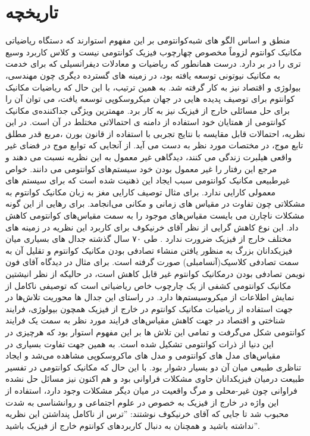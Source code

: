 \documentclass[a4paper,titlepage,12pt,fleqn,oneside]{report}
\begin{document}
  \section{تاریخچه}
 
  منطق و اساس الگو های شبه‌کوانتومی بر این مفهوم استوارند که دستگاه ریاضیاتی مکانیک کوانتوم لزوماً مخصوص چهارچوب فیزیک کوانتومی نیست و کلاس کاربرد وسیع تری را در بر دارد.  درست همانطور که ریاضیات و معادلات دیفرانسیلی که برای خدمت به مکانیک نیوتونی توسعه یافته بود،  در زمینه های گسترده دیگری چون مهندسی،  بیولوژی و اقتصاد  نیز به کار گرفته شد.  به همین ترتیب، با این حال که ریاضیات مکانیک کوانتوم برای توصیف پدیده هایی در جهان میکروسکوپی  توسعه یافت،  می توان آن را برای حل مسائلی خارج از فیزیک نیز به کار برد.  مهمترین ویژگی جداکننده‌ی مکانیک کوانتومی از همتایان خود استفاده از دامنه ی احتمالاتی مختلط در آن است. در این نظریه، احتمالات قابل مقایسه با نتایج تجربی با استفاده از قانون بورن ،مربع قدر مطلق تابع موج، در مختصات مورد نظر به دست می آید.  از آنجایی که توابع موج در فضای غیر واقعی 
  هیلبرت   زندگی می کنند،  دیدگاهی غیر معمول به این نظریه نسبت می دهند و مرجع  این رفتار را غیر معمول بودن خود  سیستم‌های  کوانتومی می دانند. خواص غیرطبیعی مکانیک کوانتومی سبب ایجاد این ذهنیت شده است که برای سیستم های معمولی کارایی ندارد.  برای مثال توصیف کارایی مغز به زبان مکانیک کوانتوم به مشکلاتی چون تفاوت در مقیاس های زمانی و مکانی  می‌انجامد.  برای رهایی از این گونه مشکلات ناچارن می بایست مقیاس‌های موجود را به سمت مقیاس‌های کوانتومی کاهش داد.  این نوع کاهش گرایی از نظر آقای خرنیکوف برای کاربرد این نظریه در زمینه های مختلف  خارج از فیزیک ضرورت ندارد \cite{kh4}
 . طی ۷۰ سال گذشته جدال های بسیاری میان فیزیکدانان بزرگ به منظور یافتن منشاء 
  تصادفی بودن مکانیک کوانتوم  و تقلیل آن به سمت تصادفی کلاسیک(آنسامبلی) صورت گرفته است.  برای مثال در دیدگاه آقای فون نویمن تصادفی بودن درمکانیک کوانتوم غیر قابل کاهش است، در حالیکه از نظر انیشتین مکانیک کوانتومی کشفی از  یک چارچوب خاص ریاضیاتی است که  توصیفی ناکامل از نمایش اطلاعات از میکروسیستم‌ها دارد.  در راستای این جدال ها محوریت تلاش‌ها در جهت استفاده از ریاضیات مکانیک کوانتوم در خارج از فیزیک همچون بیولوژی، فرایند شناختی و اقتصاد در جهت کاهش مقیاس‌های فرایند مورد نظر به سمت یک فرایند کوانتومی شکل می‌گرفت و تمامی این تلاش ها بر این مفهوم استوار بود که هرچیزی در این دنیا از ذرات کوانتومی تشکیل شده است. به همین جهت تفاوت بسیاری در مقیاس‌های مدل های کوانتومی و مدل های ماکروسکوپی مشاهده می‌شد و ایجاد  تناظری طبیعی میان آن دو بسیار دشوار بود.  با این حال که مکانیک کوانتومی در تفسیر طبیعت درمیان فیزیکدانان حاوی مشکلات فراوانی بود و هم اکنون نیز مسائل حل نشده فراوانی چون غیر-محلی و مرگ واقعیت در میان دیگر مشکلات وجود دارد،  استفاده از این واژه در خارج از فیزیک به خصوص در علوم اجتماعی و روانشناسی به شدت محبوب شد تا جایی که آقای خرنیکوف نوشتند:  ''ترس از ناکامل پنداشتن این نظریه نداشته باشید و همچنان به دنبال کاربردهای کوانتوم خارج از فیزیک باشید''. 
  
\end{document}
